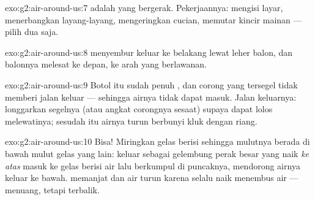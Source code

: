 \begin{solution}{exo:g2:air-around-us:7}
 adalah  yang bergerak. Pekerjaannya: mengisi layar,
menerbangkan layang-layang, mengeringkan cucian, memutar kincir mainan
--- pilih dua saja.
\end{solution}

\begin{solution}{exo:g2:air-around-us:8}
 menyembur keluar ke belakang lewat leher balon, dan balonnya
melesat ke depan, ke arah yang berlawanan.
\end{solution}

\begin{solution}{exo:g2:air-around-us:9}
Botol itu sudah penuh , dan corong yang tersegel tidak memberi
 jalan keluar --- sehingga airnya tidak dapat masuk. Jalan
keluarnya: longgarkan segelnya (atau angkat corongnya sesaat) supaya
 dapat lolos melewatinya; sesudah itu airnya turun berbunyi kluk
dengan riang.
\end{solution}

\begin{solution}{exo:g2:air-around-us:10}
Bisa! Miringkan gelas berisi  sehingga mulutnya berada di bawah
mulut gelas yang lain:  keluar sebagai gelembung perak besar
yang naik \emph{ke atas} masuk ke gelas berisi air lalu berkumpul di
puncaknya, mendorong airnya keluar ke bawah.  memanjat dan air
turun karena  selalu  naik menembus air --- menuang, tetapi
terbalik.
\end{solution}
